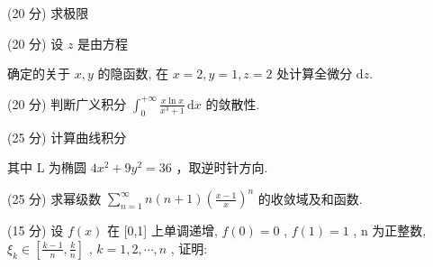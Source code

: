 \par{}
(20 分) 求极限\par
\nopagebreak[4]
\par{}
(20 分) 设 $z$ 是由方程\par
\nopagebreak[4]
确定的关于 $x, y$ 的隐函数, 在 $x = 2, y = 1, z = 2$ 处计算全微分 $\mathrm{d}z$.\par
(20 分) 判断广义积分 $\int_0^{+\infty} \frac{x \ln x}{x^3 + 1} \, \mathrm{d}x$ 的敛散性.\par
\par{}
(25 分) 计算曲线积分\par
\nopagebreak[4]
其中 L 为椭圆  $4x^{2} + 9y^{2} = 36$ ，取逆时针方向.\par
(25 分) 求幂级数 $\sum_{n=1}^{\infty} n(n+1)\left(\frac{x-1}{x}\right)^n$ 的收敛域及和函数.\par
\par{}
(15 分) 设  $f(x)$  在 [0,1] 上单调递增,  $f(0)=0$ ,  $f(1)=1$ , n 为正整数,  $\xi_{k}\in\left[\frac{k-1}{n},\frac{k}{n}\right]$ ,  $k=1,2,\cdots,n$ , 证明:\par
\nopagebreak[4]
